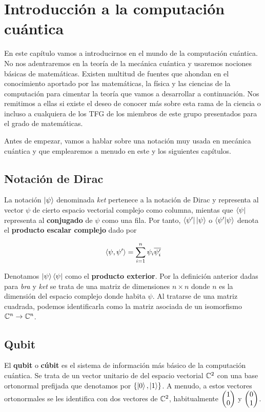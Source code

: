 \chapter{Introducción a la computación cuántica}

En este capítulo vamos a introducirnos en el mundo de la computación cuántica. No nos adentraremos en la teoría de la mecánica cuántica y usaremos nociones básicas de matemáticas. Existen multitud de fuentes que ahondan en el conocimiento aportado por las matemáticas, la física y las ciencias de la computación para cimentar la teoría que vamos a desarrollar a continuación. Nos remitimos a ellas si existe el deseo de conocer más sobre esta rama de la ciencia o incluso a cualquiera de los TFG de los miembros de este grupo presentados para el grado de matemáticas.

Antes de empezar, vamos a hablar sobre una notación muy usada en mecánica cuántica y que emplearemos a menudo en este y los siguientes capítulos.

\section{Notación de Dirac}

La notación $\left|\psi\right\rangle$ denominada \textit{ket} pertenece a la notación de Dirac y representa al vector $\psi$ de cierto espacio vectorial complejo como columna, mientas que $\left\langle\psi\right|$ representa al \textbf{conjugado} de $\psi$ como una fila. Por tanto, $\left\langle\psi'\right|\left|\psi\right\rangle$ o $\left\langle\psi'|\psi\right\rangle$ denota el \textbf{producto escalar complejo} dado por

\begin{equation}
\langle\psi,\psi'\rangle=\sum_{i=1}^{n}\psi_i\overline{\psi'_i}
\end{equation}

Denotamos $\left|\psi\right\rangle\left\langle\psi\right|$ como el \textbf{producto exterior}. Por la definición anterior dadas para \textit{bra} y \textit{ket} se trata de una matriz de dimensiones $n\times n$ donde $n$ es la dimensión del espacio complejo donde habita $\psi$. Al tratarse de una matriz cuadrada, podemos identificarla como la matriz asociada de un isomorfismo $\mathbb{C}^n\to\mathbb{C}^n$.

\section{Qubit}

El \textbf{qubit} o \textbf{cúbit} es el sistema de información más básico de la computación cuántica. Se trata de un vector unitario de del espacio vectorial $\mathbb{C}^2$ con una base ortonormal prefijada que denotamos por $\{\left|0\right\rangle,\left|1\right\rangle\}$. A menudo, a estos vectores ortonormales se les identifica con dos vectores de $\mathbb{C}^2$, habitualmente $\begin{pmatrix} 1 \\ 0 \end{pmatrix}$ y $\begin{pmatrix} 0 \\ 1 \end{pmatrix}$.

